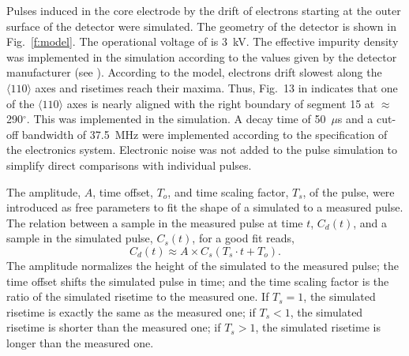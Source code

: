 \documentclass[epj,referee]{svjour}
\begin{document}
Pulses induced in the core electrode by the drift of electrons
starting at the outer surface of the detector were simulated. The
geometry of the detector is shown in Fig.~\ref{f:model}. The
operational voltage of is 3~kV. The effective impurity density was
implemented in the simulation according to the values given by the
detector manufacturer (see \cite{si}). According to the model,
electrons drift slowest along the $\langle 110 \rangle$ axes and
risetimes reach their maxima. Thus, Fig.~13 in \cite{si} indicates
that one of the $\langle 110 \rangle$ axes is nearly aligned with the
right boundary of segment 15 at $\approx$\,290$^\circ$. This was
implemented in the simulation. A decay time of 50~$\mu$s and a cut-off
bandwidth of 37.5~MHz were implemented according to the specification
of the electronics system. Electronic noise was not added to the pulse
simulation to simplify direct comparisons with individual pulses. 

The amplitude, $A$, time offset, $T_{o}$, and time scaling factor,
$T_{s}$, of the pulse, were introduced as free parameters to fit the
shape of a simulated to a measured pulse. The relation between a
sample in the measured pulse at time $t$, $C_{d}(t)$, and a sample in
the simulated pulse, $C_{s}(t)$, for a good fit reads,
\begin{equation}
\label{e:tsc}
C_{d}(t) \approx A \times C_{s}(T_{s} \cdot t + T_{o}).
\end{equation}
The amplitude normalizes the height of the simulated to the measured
pulse; the time offset shifts the simulated pulse in time; and the
time scaling factor is the ratio of the simulated risetime to the
measured one. If $T_{s} = 1$, the simulated risetime is exactly the
same as the measured one; if $T_{s} < 1$, the simulated risetime is
shorter than the measured one; if $T_{s} > 1$, the simulated risetime
is longer than the measured one.
\end{document}
